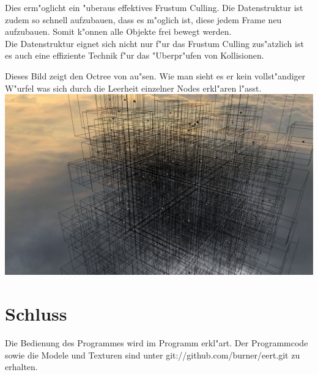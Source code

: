 \documentclass[a4paper,titlepage]{article}
\begin{document}
Dies erm"oglicht ein "uberaus effektives Frustum Culling. Die Datenstruktur ist zudem so schnell aufzubauen, 
dass es m"oglich ist, diese jedem Frame neu aufzubauen. Somit k"onnen alle Objekte frei bewegt werden.\\

Die Datenstruktur eignet sich nicht nur f"ur das Frustum Culling zus"atzlich ist es auch eine effiziente Technik
f"ur das "Uberpr"ufen von Kollisionen.

Dieses Bild zeigt den Octree von au"sen. Wie man sieht es er kein vollst"andiger W"urfel was sich durch die 
Leerheit einzelner Nodes erkl"aren l"asst.\\
\includegraphics[width = 1.0\textwidth]{oc2.png}

\section{Schluss}
Die Bedienung des Programmes wird im Programm erkl"art. Der Programmcode sowie die Modele und Texturen sind 
unter git://github.com/burner/eert.git zu erhalten. 
\end{document}
